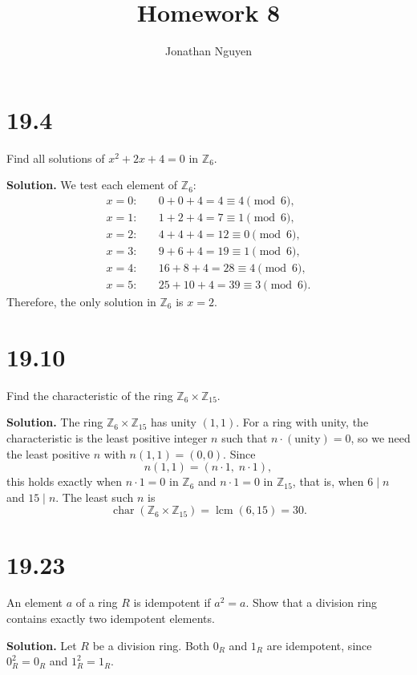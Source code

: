 \documentclass[11pt]{article}
\title{Homework 8}
\author{Jonathan Nguyen}
\date{}
\begin{document}
\maketitle

\section*{19.4}
Find all solutions of \(x^2+2x+4=0\) in \(\mathbb{Z}_{6}\).

\noindent\textbf{Solution.}
We test each element of \(\mathbb{Z}_{6}\):
\[
\begin{aligned}
x=0: &\quad 0+0+4=4 \equiv 4 \pmod{6},\\
x=1: &\quad 1+2+4=7 \equiv 1 \pmod{6},\\
x=2: &\quad 4+4+4=12 \equiv 0 \pmod{6},\\
x=3: &\quad 9+6+4=19 \equiv 1 \pmod{6},\\
x=4: &\quad 16+8+4=28 \equiv 4 \pmod{6},\\
x=5: &\quad 25+10+4=39 \equiv 3 \pmod{6}.
\end{aligned}
\]
Therefore, the only solution in \(\mathbb{Z}_{6}\) is \(\boxed{x=2}.\)

\section*{19.10}
Find the characteristic of the ring
\(\mathbb{Z}_{6}\times\mathbb{Z}_{15}\).

\noindent\textbf{Solution.}
The ring \(\mathbb{Z}_{6}\times\mathbb{Z}_{15}\) has unity \((1,1)\).
For a ring with unity, the characteristic is the least positive integer
\(n\) such that \(n\cdot(\text{unity})=0\), so we need the least
positive \(n\) with \(n(1,1)=(0,0)\). Since
\[
n(1,1)=(n\cdot1,\;n\cdot1),
\]
this holds exactly when \(n\cdot1=0\) in \(\mathbb{Z}_6\) and
\(n\cdot1=0\) in \(\mathbb{Z}_{15}\), that is, when \(6\mid n\) and
\(15\mid n\). The least such \(n\) is
\[
\boxed{
\operatorname{char}(\mathbb{Z}_{6}\times\mathbb{Z}_{15})
=\operatorname{lcm}(6,15)=30.
}
\]

\section*{19.23}
An element \(a\) of a ring \(R\) is idempotent if \(a^2=a\).
Show that a division ring contains exactly two idempotent elements.

\noindent\textbf{Solution.}
Let \(R\) be a division ring. Both \(0_R\) and \(1_R\) are idempotent,
since \(0_R^2=0_R\) and \(1_R^2=1_R\).
\end{document}
